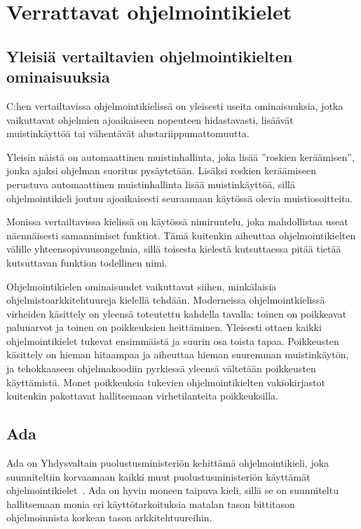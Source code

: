 \section{Verrattavat ohjelmointikielet}

\subsection{Yleisiä vertailtavien ohjelmointikielten ominaisuuksia}

C:hen vertailtavissa ohjelmointikielissä on yleisesti useita ominaisuuksia,
jotka vaikuttavat ohjelmien ajoaikaiseen nopeuteen hidastavasti, lisäävät
muistinkäyttöä tai vähentävät alustariippumattomuutta.

Yleisin näistä on automaattinen muistinhallinta, joka lisää ''roskien
keräämisen'', jonka ajaksi ohjelman suoritus
pysäytetään. Lisäksi roskien keräämiseen perustuva automaattinen
muistinhallinta lisää muistinkäyttöä, sillä ohjelmointikieli joutuu
ajoaikaisesti seuraamaan käytössä olevia muistiosoitteita.

Monissa vertailtavissa kielissä on käytössä nimiruntelu,
joka mahdollistaa useat näennäisesti samannimiset funktiot. Tämä kuitenkin
aiheuttaa ohjelmointikielten välille yhteensopivuusongelmia, sillä toisesta
kielestä kutsuttaessa pitää tietää kutsuttavan funktion todellinen nimi.

Ohjelmointikielen ominaisuudet vaikuttavat siihen, minkälaisia
ohjelmistoarkkitehtuureja kielellä tehdään\citationneeded. Moderneissa
ohjelmointkielissä virheiden käsittely on yleensä toteutettu kahdella tavalla:
toinen on poikkeavat paluuarvot ja toinen on poikkeuksien heittäminen.
Yleisesti ottaen kaikki ohjelmointikielet tukevat ensimmäistä ja suurin osa
toista tapaa. Poikkeusten käsittely on hieman hitaampaa ja aiheuttaa hieman
suuremman muistinkäytön, ja tehokkaaseen ohjelmakoodiin pyrkiessä yleensä
vältetään poikkeusten käyttämistä\citationneeded. Monet poikkeuksia tukevien
ohjelmointikielten vakiokirjastot kuitenkin pakottavat hallitsemaan
virhetilanteita poikkeuksilla.

\subsection{Ada}

Ada on Yhdysvaltain puolustusministeriön kehittämä ohjelmointikieli, joka
suunniteltiin korvaamaan kaikki muut puolustusministeriön käyttämät
ohjelmointikielet~\citep{adahistory}. Ada on hyvin moneen taipuva kieli, sillä
se on suunniteltu hallitsemaan monia eri käyttötarkoituksia matalan tason
bittitason ohjelmoinnista korkean tason arkkitehtuureihin.

